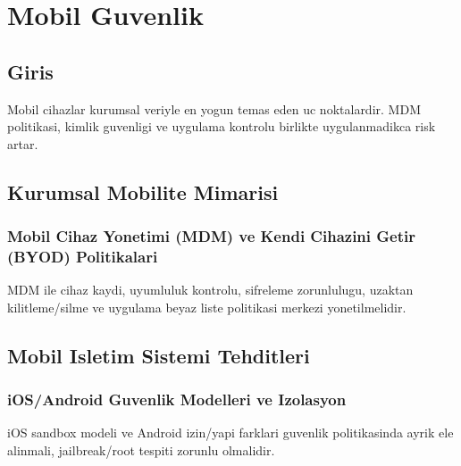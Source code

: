 ﻿\chapter{Mobil Guvenlik}

\section*{Giris}
Mobil cihazlar kurumsal veriyle en yogun temas eden uc noktalardir. MDM politikasi, kimlik guvenligi ve uygulama kontrolu birlikte uygulanmadikca risk artar.

\section{Kurumsal Mobilite Mimarisi}
\subsection{Mobil Cihaz Yonetimi (MDM) ve Kendi Cihazini Getir (BYOD) Politikalari}
MDM ile cihaz kaydi, uyumluluk kontrolu, sifreleme zorunlulugu, uzaktan kilitleme/silme ve uygulama beyaz liste politikasi merkezi yonetilmelidir.

\section{Mobil Isletim Sistemi Tehditleri}
\subsection{iOS/Android Guvenlik Modelleri ve Izolasyon}
iOS sandbox modeli ve Android izin/yapi farklari guvenlik politikasinda ayrik ele alinmali, jailbreak/root tespiti zorunlu olmalidir.

